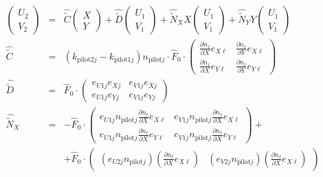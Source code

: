 \documentclass[12pt,a4paper,twoside,openright,BCOR10mm,headsepline,titlepage,abstracton,chapterprefix,final]{scrreprt}
\newcommand\wavenumber{k}
\newcommand\pilot{\textrm{pilot}}
\begin{document}
\begin{eqnarray}
 \begin{pmatrix} U_2 \\ V_2 \end{pmatrix}
 &=&
    \hat{\tilde{C}}     \begin{pmatrix} X   \\ Y   \end{pmatrix}  
  + \hat{\tilde{D}}     \begin{pmatrix} U_1 \\ V_1 \end{pmatrix}
  + \hat{\tilde{N}}_X X \begin{pmatrix} U_1 \\ V_1 \end{pmatrix}
  + \hat{\tilde{N}}_Y Y \begin{pmatrix} U_1 \\ V_1 \end{pmatrix}
  \\
  \hat{\tilde{C}} 
  &=&
     (\wavenumber_{\pilot 2 j} - \wavenumber_{\pilot 1 j}) n_{\pilot j}
     \cdot \hat{F}_0 \cdot
     \begin{pmatrix}
       \frac{\partial n_\ell}{\partial X} e_{X\ell} & \frac{\partial n_\ell}{\partial Y} e_{X\ell} 
       \\    
       \frac{\partial n_\ell}{\partial X} e_{Y\ell} & \frac{\partial n_\ell}{\partial Y} e_{Y\ell}
     \end{pmatrix} 
  \\
  \hat{\tilde{D}}
  &=&
     \hat{F}_0 \cdot
     \begin{pmatrix}
       e_{U1j} e_{Xj} &  e_{V1j} e_{Xj}
       \\
       e_{U1j} e_{Yj} &  e_{V1j} e_{Yj}
     \end{pmatrix}
  \\
  \hat{\tilde{N}}_X
  &=& - \hat{F}_0\cdot
     \begin{pmatrix}
       e_{U1j} n_{\pilot j} \frac{\partial n_\ell}{\partial X} e_{X\ell} &  e_{V1j} n_{\pilot j} \frac{\partial n_\ell}{\partial X} e_{X\ell}
       \\
       e_{U1j} n_{\pilot j} \frac{\partial n_\ell}{\partial X} e_{Y\ell} &  e_{V1j} n_{\pilot j} \frac{\partial n_\ell}{\partial X} e_{Y\ell}
     \end{pmatrix} +
  \nonumber\\
  &&+\hat{F}_0 \cdot
   \begin{pmatrix}
  (e_{U2j} n_{\pilot j}) (\frac{\partial n_\ell}{\partial X} e_{X\ell}) &  (e_{V2j} n_{\pilot j}) (\frac{\partial n_\ell}{\partial X} e_{X\ell})

\end{pmatrix}
\end{eqnarray}
\end{document}
